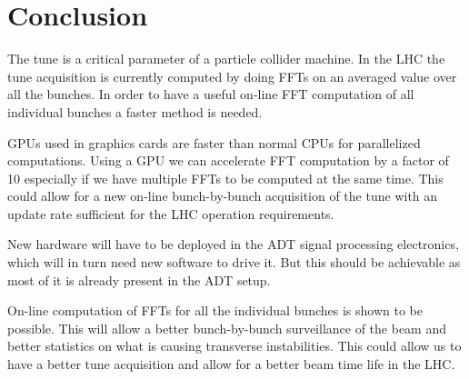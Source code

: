 
\chapter{Conclusion}


The \gls{tune} is a critical parameter of a particle collider machine. In the \gls{LHC} the \gls{tune} acquisition is currently computed by doing \glspl{FFT} on an averaged value over all the bunches. In order to have a useful on-line \gls{FFT} computation of all individual bunches a faster method is needed. 

\Glspl{GPU} used in graphics cards are faster than normal \glspl{CPU} for
parallelized computations. Using a \gls{GPU} we can accelerate
\gls{FFT} computation by a factor of 10 especially if we have
multiple \glspl{FFT} to be computed at the same time. This could allow for a new on-line
bunch-by-bunch acquisition of the \gls{tune} with an update rate sufficient for the LHC operation requirements.

New hardware will have to be deployed in the \gls{ADT} signal processing electronics, which will in turn need new software to drive it. But this should be achievable as most of it is already present in the \gls{ADT} setup.

On-line computation of \glspl{FFT} for all the individual bunches is shown to be possible. This will allow a better bunch-by-bunch surveillance of the beam and better statistics on what is causing transverse instabilities. This could allow us to have a better tune acquisition and allow for a better beam time life in the \gls{LHC}.
